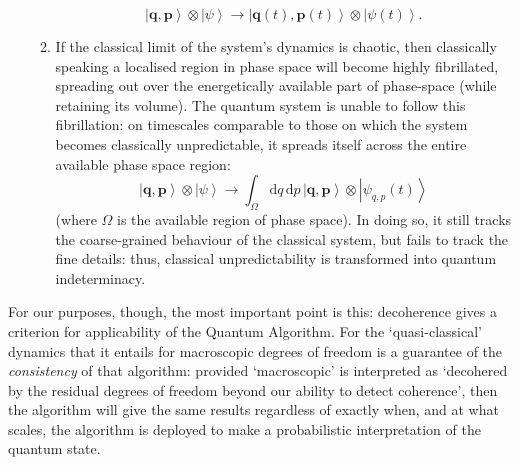\documentclass[12pt]{article}
\newcommand{\be}{\begin{equation}}
\newcommand{\ee}{\end{equation}}
\newcommand{\vctr}[1]{\ensuremath{\mathbf{ #1 }}}
\newcommand{\dr}[1]{\ensuremath{\mathrm{d} #1\,}}
\newcommand{\ket}[1]{\ensuremath{\left|  #1 \right\rangle}}
\newcommand{\tpk}[2]{\ensuremath{\ket{#1}\!\otimes\!\ket{#2}}}
\begin{document}
\begin{enumerate}
\begin{enumerate}
\be
\tpk{\vctr{q},\vctr{p}}{\psi}\longrightarrow \tpk{\vctr{q}(t),\vctr{p}(t)}{\psi(t)}.
\ee
\item If the classical limit of the system's dynamics is chaotic, then classically speaking a localised region in phase space will become highly fibrillated, spreading out over the energetically available part of phase-space (while retaining its volume). The quantum system is unable to follow this fibrillation: on timescales comparable to those on which the system becomes classically unpredictable, it spreads itself across the entire available phase space region:
\be \tpk{\vctr{q},\vctr{p}}{\psi}\longrightarrow \int_\Omega \dr{q}\dr{p}\tpk{\vctr{q},\vctr{p}}{\psi_{q,p}(t)}
\ee
(where $\Omega$ is the available region of phase space). In doing so, it still tracks the coarse-grained behaviour of the classical system, but fails to track the fine details: thus, classical unpredictability is transformed into quantum indeterminacy.
\end{enumerate}
\end{enumerate}
For our purposes, though, the most important point is this: decoherence gives a criterion for applicability of the Quantum Algorithm. For the `quasi-classical' dynamics that it entails for macroscopic degrees of freedom is a guarantee of the \emph{consistency} of that algorithm: provided `macroscopic' is interpreted as `decohered by the residual degrees of freedom beyond our ability to detect coherence', then the algorithm will give the same results regardless of exactly when, and at what scales, the algorithm is deployed to make a probabilistic interpretation of the quantum state.
\end{document}
